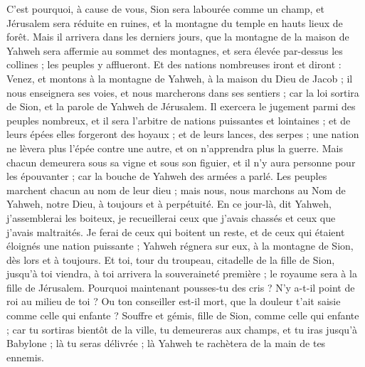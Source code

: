 \begin{multicols}{2}
C'est pourquoi, à cause de vous, Sion sera labourée comme un champ, et Jérusalem sera réduite en ruines, et la montagne du temple en hauts lieux de forêt.
\VerseOne{}Mais il arrivera dans les derniers jours, que la montagne de la maison de Yahweh sera affermie au sommet des montagnes, et sera élevée par-dessus les collines ; les peuples y afflueront.
Et des nations nombreuses iront et diront : Venez, et montons à la montagne de Yahweh, à la maison du Dieu de Jacob ; il nous enseignera ses voies, et nous marcherons dans ses sentiers ; car la loi sortira de Sion, et la parole de Yahweh de Jérusalem.
Il exercera le jugement parmi des peuples nombreux, et il sera l'arbitre de nations puissantes et lointaines ; et de leurs épées elles forgeront des hoyaux ; et de leurs lances, des serpes ; une nation ne lèvera plus l'épée contre une autre, et on n'apprendra plus la guerre.
Mais chacun demeurera sous sa vigne et sous son figuier, et il n'y aura personne pour les épouvanter ; car la bouche de Yahweh des armées a parlé.
Les peuples marchent chacun au nom de leur dieu ; mais nous, nous marchons au Nom de Yahweh, notre Dieu, à toujours et à perpétuité.
En ce jour-là, dit Yahweh, j'assemblerai les boiteux, je recueillerai ceux que j'avais chassés et ceux que j'avais maltraités.
Je ferai de ceux qui boitent un reste, et de ceux qui étaient éloignés une nation puissante ; Yahweh régnera sur eux, à la montagne de Sion, dès lors et à toujours.
Et toi, tour du troupeau, citadelle de la fille de Sion, jusqu'à toi viendra, à toi arrivera la souveraineté première ; le royaume sera à la fille de Jérusalem.
Pourquoi maintenant pousses-tu des cris ? N'y a-t-il point de roi au milieu de toi ? Ou ton conseiller est-il mort, que la douleur t'ait saisie comme celle qui enfante ?
Souffre et gémis, fille de Sion, comme celle qui enfante ; car tu sortiras bientôt de la ville, tu demeureras aux champs, et tu iras jusqu'à Babylone ; là tu seras délivrée ; là Yahweh te rachètera de la main de tes ennemis.

\end{multicols}
